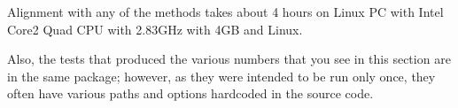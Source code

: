 Alignment with any of the methods takes about 4 hours on Linux PC with Intel Core2 Quad CPU with 2.83GHz with 4GB and Linux.

Also, the tests that produced the various numbers that you see in this section are in the same package; however, as they were intended to be run only once, they often have various paths and options hardcoded in the source code.